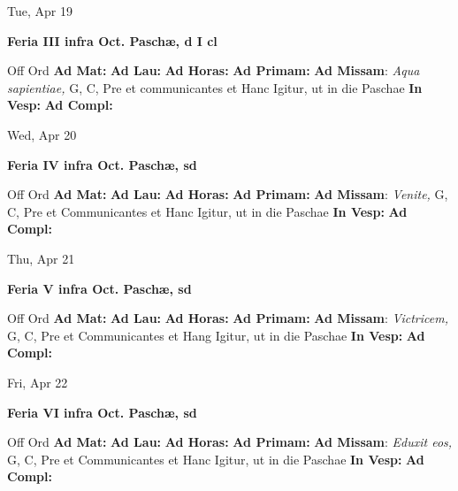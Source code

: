 \documentclass[10pt]{article}
\begin{document}
\begin{minipage}{3.5in}
\vspace{2em}\begin{center}
Tue, Apr 19
\end{center}\textbf{ \large Feria III infra Oct. Paschæ, \textnormal{\normalsize d I cl}}
\begin{justify}
Off Ord
\textbf{Ad Mat: }
\textbf{Ad Lau: }
\textbf{Ad Horas: }
\textbf{Ad Primam: }
\textbf{Ad Missam}: \textit{Aqua sapientiae,} G, C, Pre et communicantes et Hanc Igitur, ut in die Paschae
\textbf{In Vesp: }
\textbf{Ad Compl: }\end{justify}
\end{minipage}



\begin{minipage}{3.5in}
\vspace{2em}\begin{center}
Wed, Apr 20
\end{center}\textbf{ \large Feria IV infra Oct. Paschæ, \textnormal{\normalsize sd}}
\begin{justify}
Off Ord
\textbf{Ad Mat: }
\textbf{Ad Lau: }
\textbf{Ad Horas: }
\textbf{Ad Primam: }
\textbf{Ad Missam}: \textit{Venite,} G, C, Pre et Communicantes et Hanc Igitur, ut in die Paschae
\textbf{In Vesp: }
\textbf{Ad Compl: }\end{justify}
\end{minipage}



\begin{minipage}{3.5in}
\vspace{2em}\begin{center}
Thu, Apr 21
\end{center}\textbf{ \large Feria V infra Oct. Paschæ, \textnormal{\normalsize sd}}
\begin{justify}
Off Ord
\textbf{Ad Mat: }
\textbf{Ad Lau: }
\textbf{Ad Horas: }
\textbf{Ad Primam: }
\textbf{Ad Missam}: \textit{Victricem,} G, C, Pre et Communicantes et Hang Igitur, ut in die Paschae
\textbf{In Vesp: }
\textbf{Ad Compl: }\end{justify}
\end{minipage}



\begin{minipage}{3.5in}
\vspace{2em}\begin{center}
Fri, Apr 22
\end{center}\textbf{ \large Feria VI infra Oct. Paschæ, \textnormal{\normalsize sd}}
\begin{justify}
Off Ord
\textbf{Ad Mat: }
\textbf{Ad Lau: }
\textbf{Ad Horas: }
\textbf{Ad Primam: }
\textbf{Ad Missam}: \textit{Eduxit eos,} G, C, Pre et Communicantes et Hanc Igitur, ut in die Paschae
\textbf{In Vesp: }
\textbf{Ad Compl: }\end{justify}
\end{minipage}
\end{document}
